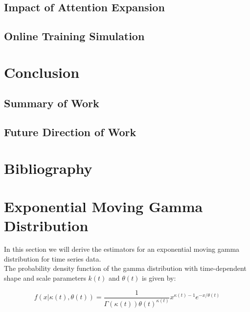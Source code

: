 \documentclass[12pt]{article}
\begin{document}
\subsection{Impact of Attention Expansion}

\subsection{Online Training Simulation}

\section{Conclusion}

\subsection{Summary of Work}

\subsection{Future Direction of Work}

\pagebreak

\section{Bibliography}


\pagebreak


\appendix

\section{Exponential Moving Gamma Distribution}
In this section we will derive the estimators for an exponential moving gamma distribution for time series data.\\


The probability density function of the gamma distribution with time-dependent shape and scale parameters $k(t)$ and $\theta(t)$ is given by:

\begin{equation}
f(x|\kappa(t), \theta(t)) = \frac{1}{\Gamma(\kappa(t))\theta(t)^{\kappa(t)}} x^{\kappa(t)-1}e^{-x/\theta(t)}
\label{eqn:time_dependent_gamma}
\end{equation}
\end{document}
